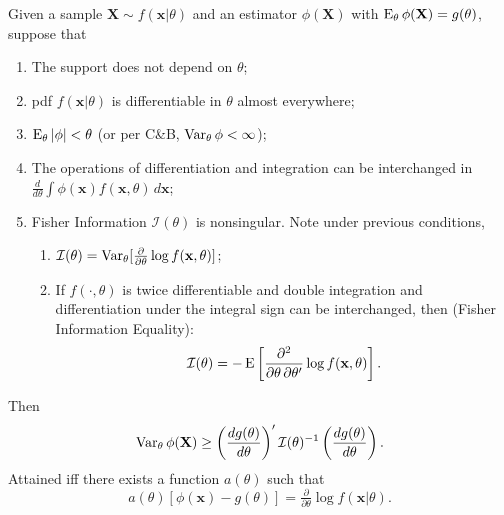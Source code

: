 \documentclass[8pt,letterpaper, landscape]{extarticle} %
\newcommand{\mX}{\ensuremath{\mathbf{X}}}
\newcommand{\mx}{\ensuremath{\mathbf{x}}}
\renewcommand{\ln}{\log}
\begin{document}
\begin{multicols}{3}
\begin{description}
 Given a sample $ \mX \sim f(\mx | \theta) $ and an estimator $ \phi (\mX) $ with $ \E_\theta \phi (\mX) = g (\theta) $, suppose that
\begin{enumerate}
\item The support does not depend on $ \theta $;
\item pdf $ f(\mx | \theta ) $ is differentiable in $ \theta $ almost everywhere;
\item $ \operatorname{E}_\theta |\phi| < \theta $ (or per C\&B, $ \operatorname{Var}_\theta \phi < \infty $);
\item The operations of differentiation and integration can be interchanged in $ \frac{d}{d \theta} \int \phi (\mx) f(\mx, \theta) \, d \mx $;
\item Fisher Information $ \mathcal{I}(\theta) $ is nonsingular. Note under previous conditions,
\begin{enumerate}
\item $ \mathcal{I} (\theta) = \Var_\theta [\tfrac{\partial}{\partial \theta} \ln f(\mx, \theta) ] $;
\item If $ f(\cdot, \theta) $ is twice differentiable and double integration and differentiation under the integral sign can be interchanged, then (Fisher Information Equality):
$$ \mathcal{I}(\theta) = - \E \left[ \frac{\partial^2}{\partial \theta \, \partial \theta'} \ln f(\mx,\theta) \right]. $$
\end{enumerate}
\end{enumerate}
Then
$$ \Var_\theta \phi (\mX) \geq \left( \frac{d g(\theta)}{d \theta} \right)' \mathcal{I}(\theta)^{-1} \left( \frac{d g(\theta)}{d \theta} \right). $$
Attained iff there exists a function $ a(\theta) $ such that
$$ a(\theta) [\phi(\mx) - g (\theta) ] = \tfrac{\partial}{\partial \theta} \log f(\mx| \theta). $$


\end{description}
\end{multicols}
\end{document}
